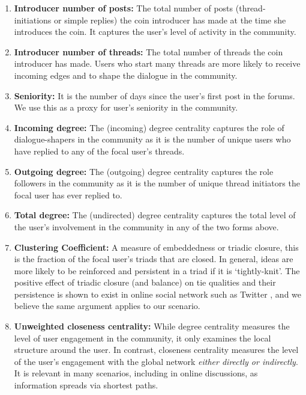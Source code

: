 \begin{enumerate}[topsep=0pt,itemsep=-0.5ex,partopsep=1ex,parsep=1ex]
  \item \textbf{Introducer number of posts:} The total number of posts (thread-initiations or simple replies) the coin introducer has made at the time she introduces the coin. It captures the user's level of activity in the community.
  \item \textbf{Introducer number of threads:} The total number of threads the coin introducer has made. Users who start many threads are more likely to receive incoming edges and to shape the dialogue in the community.
  \item \textbf{Seniority:} It is the number of days since the user's first post in the forums. We use this as a proxy for user's seniority in the community.
  \item \textbf{Incoming degree:} The (incoming) degree centrality captures the role of dialogue-shapers in the community as it is the number of unique users who have replied to any of the focal user's threads.
  \item \textbf{Outgoing degree:} The (outgoing) degree centrality captures the role followers in the community as it is the number of unique thread initiators the focal user has ever replied to. 
  \item \textbf{Total degree:} The (undirected) degree centrality captures the total level of the user's involvement in the community in any of the two forms above.
  \item \textbf{Clustering Coefficient:} A measure of embeddedness or triadic closure, this is the fraction of the focal user's triads that are closed. In general, ideas are more likely to be reinforced and persistent in a triad if it is `tightly-knit'. The positive effect of triadic closure (and balance) on tie qualities and their persistence is shown to exist in online social network such as Twitter \cite{KleinbergBalance}, and we believe the same argument applies to our scenario.
  \item \textbf{Unweighted closeness centrality:} While degree centrality measures the level of user engagement in the community, it only examines the local structure around the user.  In contrast, closeness centrality measures the level of the user's engagement with the global network \textit{either directly or indirectly}. It is relevant in many scenarios, including in online discussions, as information spreads via shortest paths. 
  

\end{enumerate}
